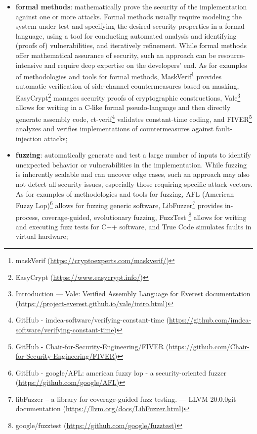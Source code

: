 \begin{itemize}
	\item \textbf{formal methods}: mathematically prove the security of the implementation against one or more attacks. Formal methods usually require modeling the system under test and specifying the desired security properties in a formal language, using a tool for conducting automated analysis and identifying (proofs of) vulnerabilities, and iteratively refinement. While formal methods offer mathematical assurance of security, such an approach can be resource-intensive and require deep expertise on the developers' end. As for examples of methodologies and tools for formal methods, MaskVerif\footnote{maskVerif (\url{https://cryptoexperts.com/maskverif/})} \cite{sako_maskverif_2019} provides automatic verification of side-channel countermeasures based on masking, EasyCrypt\footnote{EasyCrypt (\url{https://www.easycrypt.info/})} \cite{hutchison_computer_2011,aldini_easycrypt_2014} manages security proofs of cryptographic constructions, Vale\footnote{Introduction — Vale: Verified Assembly Language for Everest documentation (\url{https://project-everest.github.io/vale/intro.html})} allows for writing in a C-like formal pseudo-language and then directly generate assembly code, ct-verif\footnote{GitHub - imdea-software/verifying-constant-time (\url{https://github.com/imdea-software/verifying-constant-time})} \cite{almeida_verifying_2016} validates constant-time coding, and FIVER\footnote{GitHub - Chair-for-Security-Engineering/FIVER (\url{https://github.com/Chair-for-Security-Engineering/FIVER})} \cite{richter_fiver_2021} analyzes and verifies implementations of countermeasures against fault-injection attacks;
	
	\item \textbf{fuzzing}: automatically generate and test a large number of inputs to identify unexpected behavior or vulnerabilities in the implementation. While fuzzing is inherently scalable and can uncover edge cases, such an approach may also not detect all security issues, especially those requiring specific attack vectors. As for examples of methodologies and tools for fuzzing, AFL (American Fuzzy Lop)\footnote{GitHub - google/AFL: american fuzzy lop - a security-oriented fuzzer (\url{https://github.com/google/AFL})} allows for fuzzing generic software, LibFuzzer\footnote{libFuzzer – a library for coverage-guided fuzz testing. — LLVM 20.0.0git documentation (\url{https://llvm.org/docs/LibFuzzer.html})} provides in-process, coverage-guided, evolutionary fuzzing, FuzzTest \footnote{google/fuzztest (\url{https://github.com/google/fuzztest})} allows for writing and executing fuzz tests for C++ software, and True Code simulates faults in virtual hardware;
		

\end{itemize}
